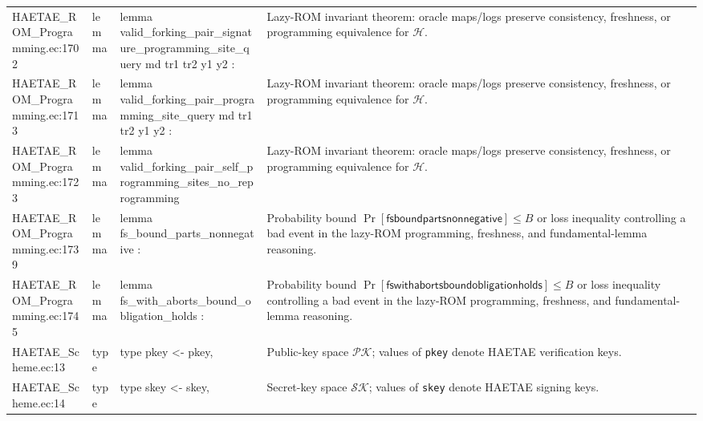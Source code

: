 \documentclass[10pt]{article}
\newcommand{\EC}[1]{\texttt{#1}}
\begin{document}
\begin{longtable}{L{0.11\textwidth}L{0.055\textwidth}L{0.385\textwidth}L{0.41\textwidth}}
HAETAE\_\allowbreak{}ROM\_\allowbreak{}Programming.\allowbreak{}ec:\allowbreak{}1702 & lemma & {\ttfamily\scriptsize lemma valid\_\allowbreak{}forking\_\allowbreak{}pair\_\allowbreak{}signature\_\allowbreak{}programming\_\allowbreak{}site\_\allowbreak{}query md tr1 tr2 y1 y2 :} & Lazy-ROM invariant theorem: oracle maps/logs preserve consistency, freshness, or programming equivalence for $\mathcal H$. \\
HAETAE\_\allowbreak{}ROM\_\allowbreak{}Programming.\allowbreak{}ec:\allowbreak{}1713 & lemma & {\ttfamily\scriptsize lemma valid\_\allowbreak{}forking\_\allowbreak{}pair\_\allowbreak{}programming\_\allowbreak{}site\_\allowbreak{}query md tr1 tr2 y1 y2 :} & Lazy-ROM invariant theorem: oracle maps/logs preserve consistency, freshness, or programming equivalence for $\mathcal H$. \\
HAETAE\_\allowbreak{}ROM\_\allowbreak{}Programming.\allowbreak{}ec:\allowbreak{}1723 & lemma & {\ttfamily\scriptsize lemma valid\_\allowbreak{}forking\_\allowbreak{}pair\_\allowbreak{}self\_\allowbreak{}programming\_\allowbreak{}sites\_\allowbreak{}no\_\allowbreak{}reprogramming} & Lazy-ROM invariant theorem: oracle maps/logs preserve consistency, freshness, or programming equivalence for $\mathcal H$. \\
HAETAE\_\allowbreak{}ROM\_\allowbreak{}Programming.\allowbreak{}ec:\allowbreak{}1739 & lemma & {\ttfamily\scriptsize lemma fs\_\allowbreak{}bound\_\allowbreak{}parts\_\allowbreak{}nonnegative :} & Probability bound $\Pr[\mathsf{fsboundpartsnonnegative}]\le B$ or loss inequality controlling a bad event in the lazy-ROM programming, freshness, and fundamental-lemma reasoning. \\
HAETAE\_\allowbreak{}ROM\_\allowbreak{}Programming.\allowbreak{}ec:\allowbreak{}1745 & lemma & {\ttfamily\scriptsize lemma fs\_\allowbreak{}with\_\allowbreak{}aborts\_\allowbreak{}bound\_\allowbreak{}obligation\_\allowbreak{}holds :} & Probability bound $\Pr[\mathsf{fswithabortsboundobligationholds}]\le B$ or loss inequality controlling a bad event in the lazy-ROM programming, freshness, and fundamental-lemma reasoning. \\
HAETAE\_\allowbreak{}Scheme.\allowbreak{}ec:\allowbreak{}13 & type & {\ttfamily\scriptsize type pkey \textless{}- pkey,} & Public-key space $\mathcal{PK}$; values of \EC{pkey} denote HAETAE verification keys. \\
HAETAE\_\allowbreak{}Scheme.\allowbreak{}ec:\allowbreak{}14 & type & {\ttfamily\scriptsize type skey \textless{}- skey,} & Secret-key space $\mathcal{SK}$; values of \EC{skey} denote HAETAE signing keys. \\

\end{longtable}
\end{document}
